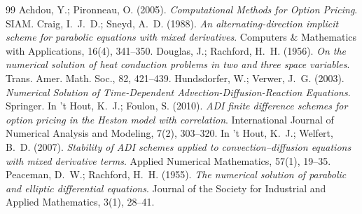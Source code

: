 \documentclass[11pt]{article}
\theoremstyle{plain}
\theoremstyle{definition}
\theoremstyle{remark}
\begin{document}
\begin{thebibliography}{99}
         Achdou, Y.; Pironneau, O. (2005). \emph{Computational Methods for Option Pricing}. SIAM.
              Craig, I.~J.~D.; Sneyd, A.~D. (1988). \emph{An alternating-direction implicit scheme for parabolic equations with mixed derivatives}. Computers \& Mathematics with Applications, 16(4), 341--350.
         Douglas, J.; Rachford, H.~H. (1956). \emph{On the numerical solution of heat conduction problems in two and three space variables}. Trans. Amer. Math. Soc., 82, 421--439.
       Hundsdorfer, W.; Verwer, J.~G. (2003). \emph{Numerical Solution of Time-Dependent Advection-Diffusion-Reaction Equations}. Springer.
            In 't Hout, K.~J.; Foulon, S. (2010). \emph{ADI finite difference schemes for option pricing in the Heston model with correlation}. International Journal of Numerical Analysis and Modeling, 7(2), 303--320.
           In 't Hout, K.~J.; Welfert, B.~D. (2007). \emph{Stability of ADI schemes applied to convection--diffusion equations with mixed derivative terms}. Applied Numerical Mathematics, 57(1), 19--35.
        Peaceman, D.~W.; Rachford, H.~H. (1955). \emph{The numerical solution of parabolic and elliptic differential equations}. Journal of the Society for Industrial and Applied Mathematics, 3(1), 28--41.
\end{thebibliography}
\end{document}
